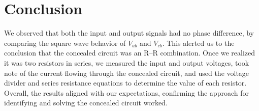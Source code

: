 \documentclass[11pt]{article}
\begin{document}
\section*{Conclusion}

We observed that both the input and output signals had no phase difference,
by comparing the square wave behavior of $V_{ab}$ and $V_{cb}$. This alerted
us to the conclusion that the concealed circuit was an R--R combination.
Once we realized it was two resistors in series, we measured the input and
output voltages, took note of the current flowing through the concealed
circuit, and used the voltage divider and series resistance equations to
determine the value of each resistor. Overall, the results aligned with our
expectations, confirming the approach for identifying and solving the
concealed circuit worked.
\end{document}
